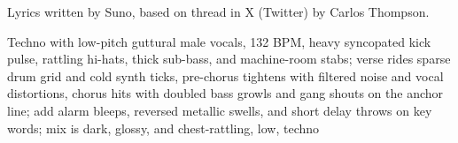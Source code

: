 

\begin{notes}
Lyrics written by Suno, based on thread in X (Twitter) by Carlos Thompson.
\end{notes}

\begin{style}
Techno with low-pitch guttural male vocals, 132 BPM, heavy syncopated kick pulse, rattling hi-hats, thick sub-bass, and machine-room stabs; verse rides sparse drum grid and cold synth ticks, pre-chorus tightens with filtered noise and vocal distortions, chorus hits with doubled bass growls and gang shouts on the anchor line; add alarm bleeps, reversed metallic swells, and short delay throws on key words; mix is dark, glossy, and chest-rattling, low, techno
\end{style}

